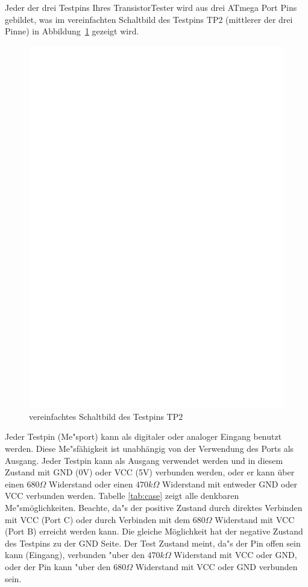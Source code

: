 Jeder der drei Testpins Ihres TransistorTester wird aus drei ATmega Port Pins gebildet,
was im vereinfachten Schaltbild des Testpins TP2 (mittlerer der drei Pinne) in Abbildung~\ref{fig:terminal} gezeigt wird.

\begin{figure}[h]
\centering
\includegraphics[]{../FIG/terminal.eps}
\caption{vereinfachtes Schaltbild des Testpins TP2}
\label{fig:terminal}
\end{figure}
Jeder Testpin (Me"sport) kann als digitaler oder analoger Eingang benutzt werden.
Diese Me"s\-f\"ahig\-keit ist un\-abh\"an\-gig von der Verwendung des Ports als Ausgang.
Jeder Testpin kann als Ausgang verwendet werden und in diesem Zustand mit GND (0V) oder VCC (5V) verbunden werden,
oder er kann \"uber einen \(680\Omega\) Widerstand oder einen \(470k\Omega\) Widerstand mit entweder GND oder VCC verbunden werden.
Tabelle \ref{tab:case} zeigt alle denkbaren Me"sm\"oglichkeiten.
Beachte, da"s der positive Zustand durch direktes Verbinden mit VCC (Port C) oder
durch Verbinden mit dem \(680\Omega\) Widerstand mit VCC (Port B) erreicht werden kann.
Die gleiche M\"oglichkeit hat der negative Zustand des Testpins zu der GND Seite.
Der Test Zustand meint, da"s der Pin offen sein kann (Eingang), verbunden "uber den \(470k\Omega\) Widerstand
mit VCC oder GND, oder der Pin kann "uber den \(680\Omega\) Widerstand mit VCC oder GND verbunden sein.

